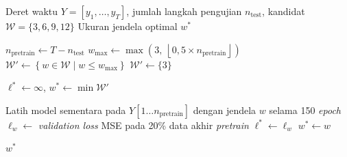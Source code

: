\begin{algorithm}[htbp]
\caption{Penyesuaian Otomatis Ukuran Jendela (\textit{Auto-Tune Window Size})}
\label{alg:auto-tune-window}
\begin{algorithmic}[1]
\Require Deret waktu $Y = [y_1, \ldots, y_T]$, jumlah langkah pengujian $n_{\text{test}}$,
\Statex \quad kandidat $\mathcal{W} = \{3, 6, 9, 12\}$
\Ensure Ukuran jendela optimal $w^*$

\State $n_{\text{pretrain}} \gets T - n_{\text{test}}$
\State $w_{\max} \gets \max\!\left(3,\ \left\lfloor 0{,}5 \times n_{\text{pretrain}} \right\rfloor\right)$
\State $\mathcal{W}' \gets \left\{ w \in \mathcal{W} \mid w \leq w_{\max} \right\}$
    \State $\mathcal{W}' \gets \{3\}$ 
\EndIf

\State $\ell^* \gets \infty$, $w^* \gets \min \mathcal{W}'$

    \State Latih model sementara pada $Y[1 \ldots n_{\text{pretrain}}]$ dengan jendela $w$ selama 150 \textit{epoch}
    \State $\ell_w \gets$ \textit{validation loss} MSE pada 20\% data akhir \textit{pretrain}
        \State $\ell^* \gets \ell_w$
        \State $w^* \gets w$
    \EndIf
\EndFor

\State \Return $w^*$
\end{algorithmic}
\end{algorithm}
